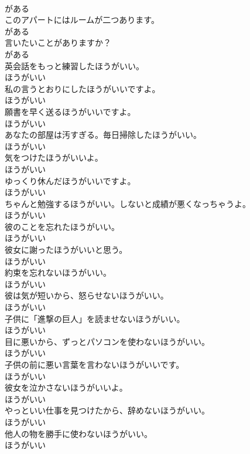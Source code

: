 \documentclass[8pt]{extreport}
\begin{document}
\begin{CJK}{UTF8}{min}
\\	がある
\\	このアパートにはルームが二つあります。	
\\	がある
\\	言いたいことがありますか？	
\\	がある
\\	英会話をもっと練習したほうがいい。	
\\	ほうがいい
\\	私の言うとおりにしたほうがいいですよ。	
\\	ほうがいい
\\	願書を早く送るほうがいいですよ。	
\\	ほうがいい
\\	あなたの部屋は汚すぎる。毎日掃除したほうがいい。	
\\	ほうがいい
\\	気をつけたほうがいいよ。	
\\	ほうがいい
\\	ゆっくり休んだほうがいいですよ。	
\\	ほうがいい
\\	ちゃんと勉強するほうがいい。しないと成績が悪くなっちゃうよ。	
\\	ほうがいい
\\	彼のことを忘れたほうがいい。	
\\	ほうがいい
\\	彼女に謝ったほうがいいと思う。	
\\	ほうがいい
\\	約束を忘れないほうがいい。	
\\	ほうがいい
\\	彼は気が短いから、怒らせないほうがいい。	
\\	ほうがいい
\\	子供に「進撃の巨人」を読ませないほうがいい。	
\\	ほうがいい
\\	目に悪いから、ずっとパソコンを使わないほうがいい。	
\\	ほうがいい
\\	子供の前に悪い言葉を言わないほうがいいです。	
\\	ほうがいい
\\	彼女を泣かさないほうがいいよ。	
\\	ほうがいい
\\	やっといい仕事を見つけたから、辞めないほうがいい。	
\\	ほうがいい
\\	他人の物を勝手に使わないほうがいい。	
\\	ほうがいい

\end{CJK}
\end{document}
